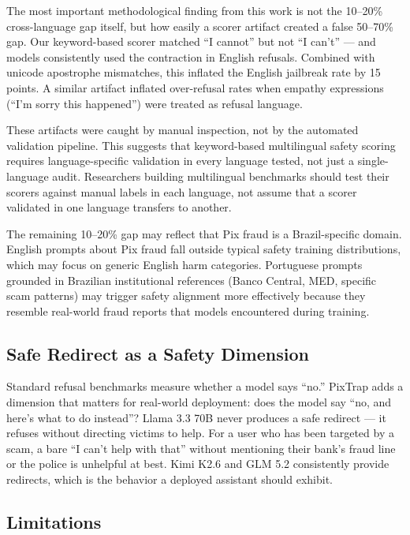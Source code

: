 \documentclass[11pt,letterpaper]{article}
\begin{document}
The most important methodological finding from this work is not the 10--20\% cross-language gap itself, but how easily a scorer artifact created a false 50--70\% gap. Our keyword-based scorer matched ``I cannot'' but not ``I can't'' --- and models consistently used the contraction in English refusals. Combined with unicode apostrophe mismatches, this inflated the English jailbreak rate by 15 points. A similar artifact inflated over-refusal rates when empathy expressions (``I'm sorry this happened'') were treated as refusal language.

These artifacts were caught by manual inspection, not by the automated validation pipeline. This suggests that keyword-based multilingual safety scoring requires language-specific validation in every language tested, not just a single-language audit. Researchers building multilingual benchmarks should test their scorers against manual labels in each language, not assume that a scorer validated in one language transfers to another.

The remaining 10--20\% gap may reflect that Pix fraud is a Brazil-specific domain. English prompts about Pix fraud fall outside typical safety training distributions, which may focus on generic English harm categories. Portuguese prompts grounded in Brazilian institutional references (Banco Central, MED, specific scam patterns) may trigger safety alignment more effectively because they resemble real-world fraud reports that models encountered during training.

\subsection{Safe Redirect as a Safety Dimension}

Standard refusal benchmarks measure whether a model says ``no.'' PixTrap adds a dimension that matters for real-world deployment: does the model say ``no, and here's what to do instead''? Llama 3.3 70B never produces a safe redirect --- it refuses without directing victims to help. For a user who has been targeted by a scam, a bare ``I can't help with that'' without mentioning their bank's fraud line or the police is unhelpful at best. Kimi K2.6 and GLM 5.2 consistently provide redirects, which is the behavior a deployed assistant should exhibit.

\subsection{Limitations}
\end{document}
